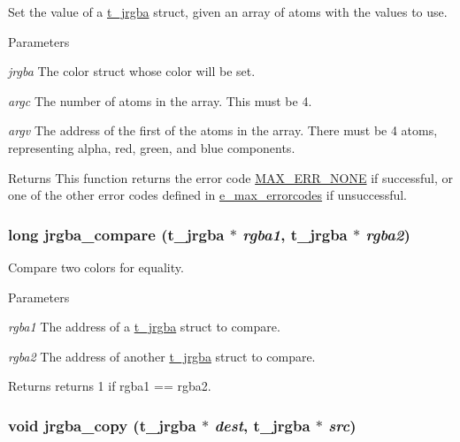 Set the value of a \hyperlink{structt__jrgba}{t\_\-jrgba} struct, given an array of atoms with the values to use. 
\begin{DoxyParams}{Parameters}
\item[{\em jrgba}]The color struct whose color will be set. \item[{\em argc}]The number of atoms in the array. This must be 4. \item[{\em argv}]The address of the first of the atoms in the array. There must be 4 atoms, representing alpha, red, green, and blue components.\end{DoxyParams}
\begin{DoxyReturn}{Returns}
This function returns the error code \hyperlink{group__misc_gga0764dd6c02b76cca7d053ae50555d69da6d22f77fef8b1e1b074cef5d29d935fd}{MAX\_\-ERR\_\-NONE} if successful, or one of the other error codes defined in \hyperlink{group__misc_ga0764dd6c02b76cca7d053ae50555d69d}{e\_\-max\_\-errorcodes} if unsuccessful. 
\end{DoxyReturn}
\hypertarget{group__color_ga585ffc0ec76fe1b5d0e1c50e8eef0b39}{
\subsubsection[{jrgba\_\-compare}]{\setlength{\rightskip}{0pt plus 5cm}long jrgba\_\-compare ({\bf t\_\-jrgba} $\ast$ {\em rgba1}, \/  {\bf t\_\-jrgba} $\ast$ {\em rgba2})}}
\label{group__color_ga585ffc0ec76fe1b5d0e1c50e8eef0b39}


Compare two colors for equality. 
\begin{DoxyParams}{Parameters}
\item[{\em rgba1}]The address of a \hyperlink{structt__jrgba}{t\_\-jrgba} struct to compare. \item[{\em rgba2}]The address of another \hyperlink{structt__jrgba}{t\_\-jrgba} struct to compare. \end{DoxyParams}
\begin{DoxyReturn}{Returns}
returns 1 if rgba1 == rgba2. 
\end{DoxyReturn}
\hypertarget{group__color_ga24a7d1e24d38a91ab8aa02a48e5da70e}{
\subsubsection[{jrgba\_\-copy}]{\setlength{\rightskip}{0pt plus 5cm}void jrgba\_\-copy ({\bf t\_\-jrgba} $\ast$ {\em dest}, \/  {\bf t\_\-jrgba} $\ast$ {\em src})}}
\label{group__color_ga24a7d1e24d38a91ab8aa02a48e5da70e}


